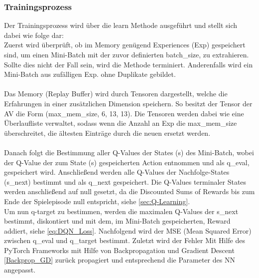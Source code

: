 \subsubsection{Trainingsprozess} \label{sub:Trainingsprozess}
Der Trainingsprozess wird über die learn Methode ausgeführt und stellt sich dabei wie folge dar:\\
Zuerst wird überprüft, ob im Memory genügend Experiences (Exp) gespeichert sind, um einen Mini-Batch mit der zuvor definierten batch\_size, zu extrahieren. Sollte dies nicht der Fall sein, wird die Methode terminiert. Anderenfalls wird ein Mini-Batch aus zufälligen Exp. ohne Duplikate gebildet.\\
\\Das Memory (Replay Buffer) wird durch Tensoren dargestellt, welche die Erfahrungen in einer zusätzlichen Dimension speichern. So besitzt der Tensor der AV die Form (max\_mem\_size, 6, 13, 13). Die Tensoren werden dabei wie eine Überlaufliste verwaltet, sodass wenn die Anzahl an Exp die max\_mem\_size überschreitet, die ältesten Einträge durch die neuen ersetzt werden.\\
\\Danach folgt die Bestimmung aller Q-Values der States (s) des Mini-Batch, wobei der Q-Value der zum State (s) gespeicherten Action entnommen und als q\_eval, gespeichert wird. 
Anschließend werden alle Q-Values der Nachfolge-States (s\_next) bestimmt und als q\_next gespeichert. Die Q-Values terminaler States werden anschließend auf null gesetzt, da die Discounted Sums of Rewards bis zum Ende der Spielepisode null entspricht, siehe \ref{sec:Q-Learning}.\\
Um nun q-target zu bestimmen, werden die maximalen Q-Values der s\_next bestimmt, diskontiert und mit dem, im Mini-Batch gespeicherten, Reward addiert, siehe \ref{eq:DQN_Loss}.
Nachfolgend wird der MSE (Mean Squared Error) zwischen q\_eval und q\_target bestimmt. Zuletzt wird der Fehler Mit Hilfe des PyTorch Frameworks mit Hilfe von Backpropagation und Gradient Descent \ref{Backprop_GD} zurück propagiert und entsprechend die Parameter des NN angepasst.

